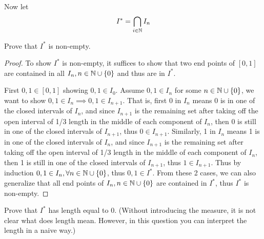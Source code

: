 \documentclass{homework}
\newcommand{\N}{\bb{N}} %
\newcommand{\?}{\stackrel{?}{=}}
\theoremstyle{definition}
\begin{document}
Now let \[I^*=\bigcap_{i\in\N}I_n\]

\question[1] Prove that $I^*$ is non-empty.

\begin{proof}
    To show $I^*$ is non-empty, it suffices to show that two end points of $[0,1]$ are contained in all $I_n,n\in\N\cup\{0\}$ and thus are in $I^*$.
    
    First $0,1\in[0,1]$ showing $0,1\in I_0$. Assume $0,1\in I_n$ for some $n\in\N\cup\{0\}$, we want to show $0,1\in I_n\implies 0,1\in I_{n+1}$. That is, first 0 in $I_n$ means 0 is in one of the closed intervals of $I_n$, and since $I_{n+1}$ is the remaining set after taking off the open interval of 1/3 length in the middle of each component of $I_n$, then 0 is still in one of the closed intervals of $I_{n+1}$, thus $0\in I_{n+1}$. Similarly, 1 in $I_n$ means 1 is in one of the closed intervals of $I_n$, and since $I_{n+1}$ is the remaining set after taking off the open interval of 1/3 length in the middle of each component of $I_n$, then 1 is still in one of the closed intervals of $I_{n+1}$, thus $1\in I_{n+1}$. Thus by induction $0,1\in I_n, \forall n\in\N\cup\{0\}$, thus $0,1\in I^*$. From these 2 cases, we can also generalize that all end points of $I_n,n\in\N\cup\{0\}$ are contained in $I^*$, thus $I^*$ is non-empty.
\end{proof}

\question[2] Prove that $I^*$ has length equal to 0. (Without introducing the measure, it is not clear what does length mean. However, in this question you can interpret the length in a naive way.)
\end{document}
